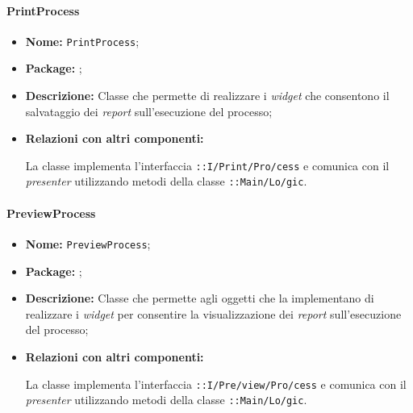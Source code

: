 \paragraph{PrintProcess}
\begin{flushleft}
\begin{itemize}
\item \textbf{Nome:} \texttt{PrintProcess};
\item \textbf{Package:} \texttt{\viewAdmin{}};
\item \textbf{Descrizione:} Classe che permette di realizzare i \textit{widget} che consentono il salvataggio dei \textit{report} sull'esecuzione del processo;
\item \textbf{Relazioni con altri componenti:}
\begin{sloppypar}
La classe implementa l'interfaccia \texttt{\iViewUser{}::I\fshyp{}Print\fshyp{}Pro\fshyp{}cess} e comunica con il \textit{presenter} utilizzando metodi della classe \texttt{\logicUser{}::Main\fshyp{}Lo\fshyp{}gic}.
\end{sloppypar}
\end{itemize}
\end{flushleft}

\paragraph{PreviewProcess}
\begin{flushleft}
\begin{itemize}
\item \textbf{Nome:} \texttt{PreviewProcess};
\item \textbf{Package:} \texttt{\viewAdmin{}};
\item \textbf{Descrizione:} Classe che permette agli oggetti che la implementano di realizzare i \textit{widget} per consentire la visualizzazione dei \textit{report} sull'esecuzione del processo;
\item \textbf{Relazioni con altri componenti:}
\begin{sloppypar}
La classe implementa l'interfaccia \texttt{\iViewUser{}::I\fshyp{}Pre\fshyp{}view\fshyp{}Pro\fshyp{}cess} e comunica con il \textit{presenter} utilizzando metodi della classe \texttt{\logicUser{}::Main\fshyp{}Lo\fshyp{}gic}.
\end{sloppypar}
\end{itemize}
\end{flushleft}